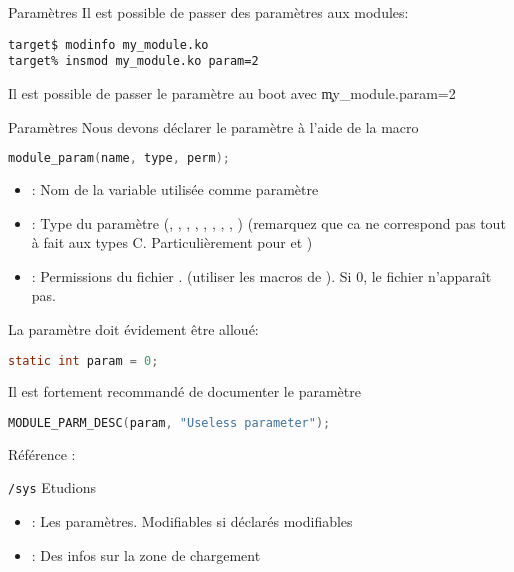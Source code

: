 \begin{frame}[fragile=singleslide]{Paramètres}
  Il est possible de passer des paramètres aux modules:
  \begin{lstlisting}
target$ modinfo my_module.ko 
target% insmod my_module.ko param=2  
  \end{lstlisting} %
  Il   est   possible   de   passer   le  paramètre   au   boot   avec
  \c{my_module.param=2}
\end{frame}

\begin{frame}[fragile=singleslide]{Paramètres}
  Nous   devons  déclarer   le  paramètre   à  l'aide   de   la  macro
  \begin{lstlisting}[language=c]
module_param(name, type, perm);
  \end{lstlisting} 
  \begin{itemize} 
  \item {}: Nom de la variable utilisée comme paramètre
  \item  {}:  Type   du  paramètre  (,  ,
    ,  ,   ,  ,  ,
    , ) (remarquez que  ca ne correspond pas tout
    à  fait   aux  types   C.  Particulièrement  pour     et
    )
  \item        {}:        Permissions        du        fichier
    .    (utiliser   les
    macros de ). Si 0, le fichier n'apparaît pas.
  \end{itemize}
  La paramètre doit évidement être alloué:
  \begin{lstlisting}[language=c]
static int param = 0;
  \end{lstlisting} 
  Il est fortement recommandé de documenter le paramètre
  \begin{lstlisting}[language=c]
MODULE_PARM_DESC(param, "Useless parameter");
  \end{lstlisting} 
  Référence : 
\end{frame}

\begin{frame}[fragile=singleslide]{\texttt{/sys}}
  Etudions 
  \begin{itemize}
  \item          {}:         Les
    paramètres. Modifiables si déclarés modifiables
  \item {}:  Des infos sur  la zone
    de chargement
  \end{itemize}
\end{frame}

